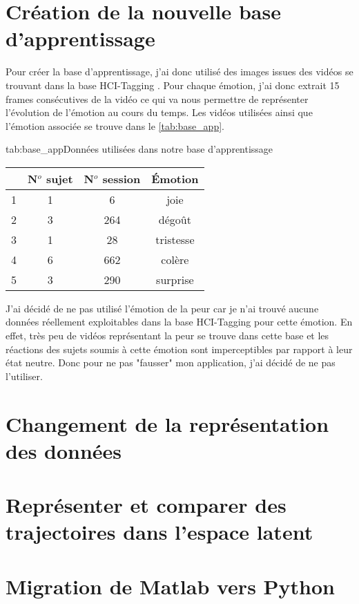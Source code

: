 \documentclass[poster]{polytech/polytech}
\begin{document}
\section{Création de la nouvelle base d'apprentissage}
Pour créer la base d'apprentissage, j'ai donc utilisé des images issues des vidéos se trouvant dans la base HCI-Tagging \cite{tagging1}\cite{tagging2}. Pour chaque émotion, j'ai donc extrait 15 frames consécutives de la vidéo ce qui va nous permettre de représenter l'évolution de l'émotion au cours du temps. Les vidéos utilisées ainsi que l'émotion associée se trouve dans le \autoref{tab:base_app}.

\begin{Table}{tab:base_app}{Données utilisées dans notre base d'apprentissage}
	\begin{tabular}{|c|c|c|c|}
		\hline
		  &\textbf{N$^{o}$ sujet} &\textbf{N$^{o}$ session}&\textbf{Émotion} \\\hline
		1& 1 & 6& joie\\\hline
		2& 3 & 264& dégoût\\\hline
		3& 1 & 28& tristesse\\\hline
		4& 6 & 662& colère\\\hline
		5& 3 & 290& surprise\\\hline
	\end{tabular}
\end{Table}

J'ai décidé de ne pas utilisé l'émotion de la peur car je n'ai trouvé aucune données réellement exploitables dans la base HCI-Tagging pour cette émotion. En effet, très peu de vidéos représentant la peur se trouve dans cette base et les réactions des sujets soumis à cette émotion sont imperceptibles par rapport à leur état neutre. Donc pour ne pas "fausser" mon application, j'ai décidé de ne pas l'utiliser.

\section{Changement de la représentation des données}

\section{Représenter et comparer des trajectoires dans l'espace latent}

\section{Migration de Matlab vers Python}
\end{document}
